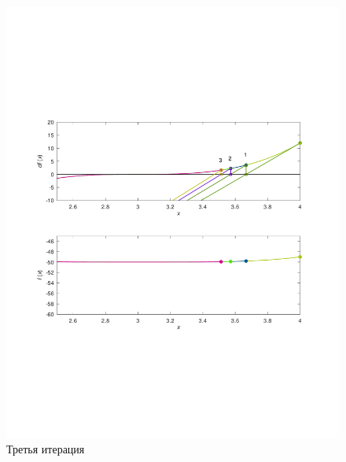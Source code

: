\documentclass[a4paper,12pt]{article}
\begin{document}
    \begin{figure}[H]
        \centering
        \includegraphics[scale=0.4]{3secantitter.pdf}
        \caption{Третья итерация}
    \end{figure}
\end{document}
